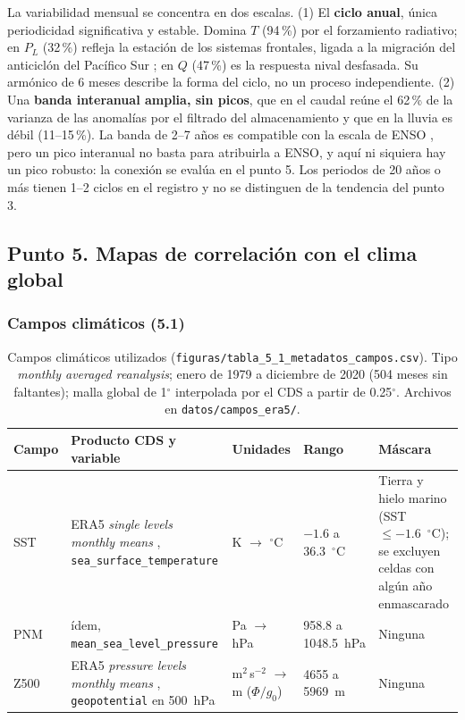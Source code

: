 \documentclass[11pt,a4paper]{article}
\newcommand{\archivo}[1]{\nolinkurl{#1}}
\newcommand{\PL}{P_L}
\newcommand{\Qm}{Q}
\begin{document}
\begin{purplebox}[title={Conclusión del punto 4}]
La variabilidad mensual se concentra en dos escalas. (1) El \textbf{ciclo anual}, única periodicidad significativa y estable. Domina $T$ (94\,\%) por el forzamiento radiativo; en $\PL$ (32\,\%) refleja la estación de los sistemas frontales, ligada a la migración del anticiclón del Pacífico Sur \citep{Garreaud2009}; en $\Qm$ (47\,\%) es la respuesta nival desfasada. Su armónico de 6 meses describe la forma del ciclo, no un proceso independiente. (2) Una \textbf{banda interanual amplia, sin picos}, que en el caudal reúne el 62\,\% de la varianza de las anomalías por el filtrado del almacenamiento y que en la lluvia es débil (11--15\,\%). La banda de 2--7 años es compatible con la escala de ENSO \citep{Trenberth1997}, pero un pico interanual no basta para atribuirla a ENSO, y aquí ni siquiera hay un pico robusto: la conexión se evalúa en el punto 5. Los periodos de 20 años o más tienen 1--2 ciclos en el registro y no se distinguen de la tendencia del punto 3.
\end{purplebox}
\subsection{Punto 5. Mapas de correlación con el clima global}
\label{sec:p5}

\subsubsection{Campos climáticos (5.1)}

\begin{table}[H]
\centering\footnotesize
\caption{Campos climáticos utilizados (\archivo{figuras/tabla_5_1_metadatos_campos.csv}). Tipo \emph{monthly averaged reanalysis}; enero de 1979 a diciembre de 2020 (504 meses sin faltantes); malla global de 1$^\circ$ interpolada por el CDS a partir de 0.25$^\circ$. Archivos en \archivo{datos/campos_era5/}.}
\label{tab:campos}
\begin{tabularx}{\textwidth}{l>{\raggedright\arraybackslash}X l l >{\raggedright\arraybackslash}X}
\toprule
Campo & Producto CDS y variable & Unidades & Rango & Máscara \\
\midrule
SST & ERA5 \emph{single levels monthly means} \citep{ERA5single}, \texttt{sea\_surface\_temperature} & K $\rightarrow$ $^\circ$C & $-1.6$ a 36.3~$^\circ$C & Tierra y hielo marino (SST $\leq-1.6$~$^\circ$C); se excluyen celdas con algún año enmascarado \\
PNM & ídem, \texttt{mean\_sea\_level\_pressure} & Pa $\rightarrow$ hPa & 958.8 a 1048.5~hPa & Ninguna \\
Z500 & ERA5 \emph{pressure levels monthly means} \citep{ERA5pressure}, \texttt{geopotential} en 500~hPa & m$^2$\,s$^{-2}$ $\rightarrow$ m ($\Phi/g_0$) & 4655 a 5969~m & Ninguna \\
\bottomrule
\end{tabularx}
\end{table}
\end{document}
